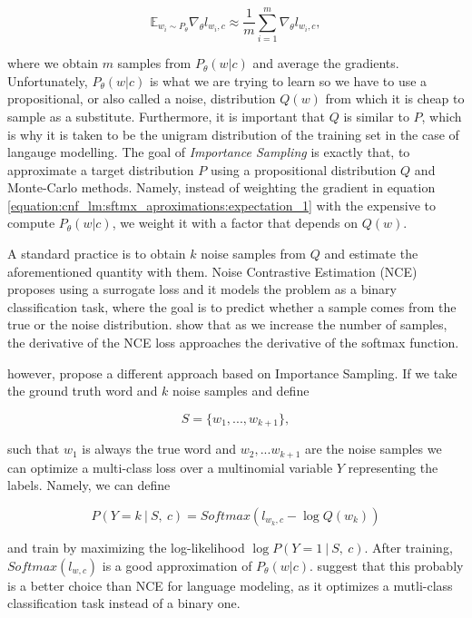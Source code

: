 \begin{displaymath}
    \mathbb{E}_{w_i \sim P_\theta} \nabla_\theta l_{w_i, c} \approx \frac{1}{m} \sum_{i=1}^m \nabla_\theta l_{w_i, c},
\end{displaymath}

where we obtain $ m $ samples from $ P_\theta( w | c ) $ and average the gradients. Unfortunately, $ P_\theta(w | c) $ is what we are trying to learn so we have to use a propositional, or also called a noise, distribution $ Q(w) $ from which it is cheap to sample as a substitute. Furthermore, it is important that $Q$ is similar to $P$, which is why it is taken to be the unigram distribution of the training set in the case of langauge modelling. The goal of \emph{Importance Sampling} is exactly that, to approximate a target distribution $ P $ using a propositional distribution $ Q $ and Monte-Carlo methods. Namely, instead of weighting the gradient in equation \ref{equation:cnf_lm:sftmx_aproximations:expectation_1} with the expensive to compute $ P_\theta( w | c ) $, we weight it with a factor that depends on $ Q(w) $.

A standard practice is to obtain $ k $ noise samples from $ Q $ and estimate the aforementioned quantity with them. Noise Contrastive Estimation (NCE) \citep{gutmann2010noise} proposes using a surrogate loss and it models the problem as a binary classification task, where the goal is to predict whether a sample comes from the true or the noise distribution. \citet{gutmann2010noise} show that as we increase the number of samples, the derivative of the NCE loss approaches the derivative of the softmax function.

\citet{jozefowicz2016exploring} however, propose a different approach based on Importance Sampling. If we take the ground truth word and $ k $ noise samples and define

\begin{displaymath}
    S = \{w_1, ..., w_{k+1} \},
\end{displaymath}

such that $ w_1 $ is always the true word and $ w_2, ... w_{k+1} $ are the noise samples we can optimize a multi-class loss over a multinomial variable $ Y $ representing the labels. Namely, we can define

\begin{displaymath}
    P(Y=k \ | \ S, \ c) = Softmax(l_{w_k, c} - \log Q(w_k))
\end{displaymath}

and train by maximizing the log-likelihood $ \log P(Y = 1 \ | \ S, \ c) $. After training, $ Softmax(l_{w, c}) $ is a good approximation of $ P_\theta(w|c) $. \citet{jozefowicz2016exploring} suggest that this probably is a better choice than NCE for language modeling, as it optimizes a mutli-class classification task instead of a binary one.
